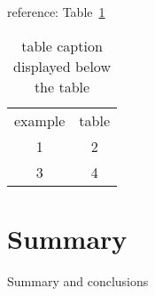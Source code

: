 \documentclass[12pt,english,seminar]{dbvstudentwork}
\begin{document}
  \Blindtext[2][2]

  reference: Table~\ref{fig:myTable}\newline

  \begin{table}[tb]
    \centering
    \begin{tabular}{cc}
      example & table\\
      1 & 2\\
      3 & 4\\
    \end{tabular}
    \caption[table caption displayed in list of figures]{table caption displayed below the table}
    \label{fig:myTable}
  \end{table}




\section{Summary} %
\label{sec:summary}

  Summary and conclusions


  \singlespacing

  \clearpage
  
  \clearpage
  \listoffigures %
  \clearpage
  \listoftables %
\end{document}
